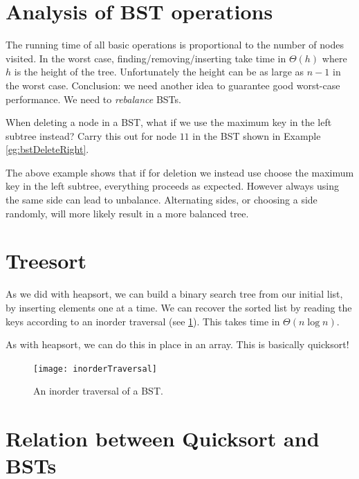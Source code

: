 \section*{Analysis of BST operations}

The running time of all basic operations is proportional to the number of 
nodes visited. In the worst case, finding/removing/inserting take time in $\Theta(h)$ 
where $h$ is the height of the tree. Unfortunately the height can be as large 
as $n-1$ in the worst case. Conclusion: we need another idea to guarantee good worst-case 
performance. We need to \emph{rebalance} BSTs.

\begin{Boxample}[5] \label{eg:bstDeleteLeft}
When deleting a node  in a BST, what if we use the maximum key in the left subtree instead?
Carry this out for node $11$ in the BST shown in Example \ref{eg:bstDeleteRight}.

\end{Boxample}


The above example shows that if for deletion we instead use choose the maximum key in the left subtree, everything proceeds as expected. 
However always using the same side can lead to unbalance. Alternating sides, or choosing a side randomly, will more likely  result in a more 
balanced tree.


\section*{Treesort}

As we did with heapsort, we can build a binary search tree from our initial list, by inserting elements one at a time. 
We can recover the sorted list by reading the keys according to an inorder traversal (see \cref{fig:inorderTraversal}). 
This takes time in $\Theta(n \log n)$.

As with heapsort, we can do this in place in an array. This is basically quicksort!

\begin{figure}[htb]
  \centering
  \texttt{[image: inorderTraversal]}
  \caption{An inorder traversal of a BST.}
  \label{fig:inorderTraversal}
\end{figure}


\section*{Relation between Quicksort and BSTs}

